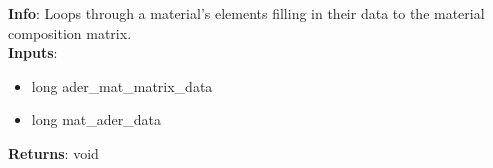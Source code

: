 \textbf{Info}: Loops through a material's elements filling in their data to
the material composition matrix. \\

\noindent \textbf{Inputs}:
\begin{itemize}
\item{long ader\_mat\_matrix\_data}
\item{long mat\_ader\_data}
\end{itemize}

\noindent \textbf{Returns}: void
